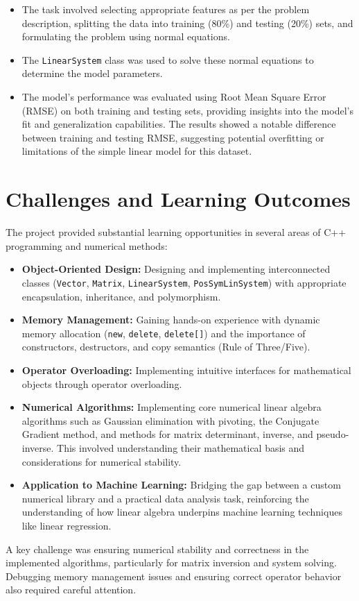 \begin{itemize}
\begin{itemize}
        \item The task involved selecting appropriate features as per the problem description, splitting the data into training (80\%) and testing (20\%) sets, and formulating the problem using normal equations.
        \item The \texttt{LinearSystem} class was used to solve these normal equations to determine the model parameters.
        \item The model's performance was evaluated using Root Mean Square Error (RMSE) on both training and testing sets, providing insights into the model's fit and generalization capabilities. The results showed a notable difference between training and testing RMSE, suggesting potential overfitting or limitations of the simple linear model for this dataset.
    \end{itemize}
\end{itemize}

\section{Challenges and Learning Outcomes}
The project provided substantial learning opportunities in several areas of C++ programming and numerical methods:
\begin{sloppypar}
\begin{itemize}
    \item \textbf{Object-Oriented Design:} Designing and implementing interconnected classes (\texttt{Vector}, \texttt{Matrix}, \texttt{LinearSystem}, \texttt{PosSymLinSystem}) with appropriate encapsulation, inheritance, and polymorphism.
    \item \textbf{Memory Management:} Gaining hands-on experience with dynamic memory allocation (\texttt{new}, \texttt{delete}, \texttt{delete[]}) and the importance of constructors, destructors, and copy semantics (Rule of Three/Five).
    \item \textbf{Operator Overloading:} Implementing intuitive interfaces for mathematical objects through operator overloading.
    \item \textbf{Numerical Algorithms:} Implementing core numerical linear algebra algorithms such as Gaussian elimination with pivoting, the Conjugate Gradient method, and methods for matrix determinant, inverse, and pseudo-inverse. This involved understanding their mathematical basis and considerations for numerical stability.
    \item \textbf{Application to Machine Learning:} Bridging the gap between a custom numerical library and a practical data analysis task, reinforcing the understanding of how linear algebra underpins machine learning techniques like linear regression.
\end{itemize}
\end{sloppypar}
A key challenge was ensuring numerical stability and correctness in the implemented algorithms, particularly for matrix inversion and system solving. Debugging memory management issues and ensuring correct operator behavior also required careful attention.

